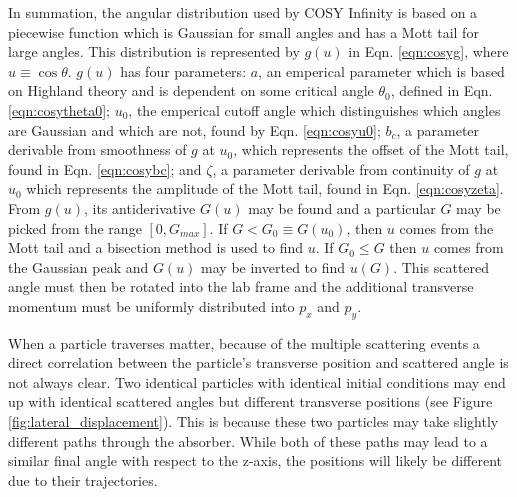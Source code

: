 In summation, the angular distribution used by COSY Infinity is based on a piecewise function which is Gaussian for small angles \cite{gs} and has a Mott tail for large angles. This distribution is represented by $g(u)$ in Eqn. \ref{eqn:cosyg}, where $u\equiv \cos\theta$. $g(u)$ has four parameters: $a$, an emperical parameter which is based on Highland theory \cite{highland} and is dependent on some critical angle $\theta_0$, defined in Eqn. \ref{eqn:cosytheta0}; $u_0$, the emperical cutoff angle which distinguishes which angles are Gaussian and which are not, found by Eqn. \ref{eqn:cosyu0}; $b_c$, a parameter derivable from smoothness of $g$ at $u_0$, which represents the offset of the Mott tail, found in Eqn. \ref{eqn:cosybc}; and $\zeta$, a parameter derivable from continuity of $g$ at $u_0$ which represents the amplitude of the Mott tail, found in Eqn. \ref{eqn:cosyzeta}. From $g(u)$, its antiderivative $G(u)$ may be found and a particular $G$ may be picked from the range $[0,G_{max}]$. If $G<G_0 \equiv G(u_0)$, then $u$ comes from the Mott tail and a bisection method is used to find $u$. If $G_0 \leq G$ then $u$ comes from the Gaussian peak and $G(u)$ may be inverted to find $u(G)$. This scattered angle must then be rotated into the lab frame and the additional transverse momentum must be uniformly distributed into $p_x$ and $p_y$.

%
%
\label{sec:COSYTransverseDisplacement}\par
When a particle traverses matter, because of the multiple scattering events a direct correlation between the particle's transverse position and scattered angle is not always clear. Two identical particles with identical initial conditions may end up with identical scattered angles but different transverse positions (see Figure \ref{fig:lateral_displacement}). This is because these two particles may take slightly different paths through the absorber. While both of these paths may lead to a similar final angle with respect to the z-axis, the positions will likely be different due to their trajectories.

